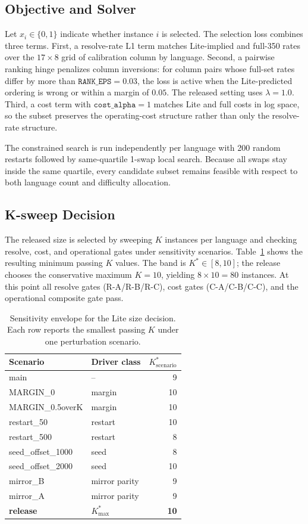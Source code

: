 \documentclass{llmxive}
\begin{document}
\subsection{Objective and Solver}

Let $x_i\in\{0,1\}$ indicate whether instance $i$ is selected.  The
selection loss combines three terms.  First, a resolve-rate L1 term
matches Lite-implied and full-350 rates over the $17\times 8$ grid of
calibration column by language.  Second, a pairwise ranking hinge
penalizes column inversions: for column pairs whose full-set rates
differ by more than $\texttt{RANK\_EPS}=0.03$, the loss is active when
the Lite-predicted ordering is wrong or within a margin of $0.05$.
The released setting uses $\lambda=1.0$.  Third, a cost term with
$\texttt{cost\_alpha}=1$ matches Lite and full costs in log space, so
the subset preserves the operating-cost structure rather than only the
resolve-rate structure.

The constrained search is run independently per language with 200
random restarts followed by same-quartile 1-swap local search.  Because
all swaps stay inside the same quartile, every candidate subset remains
feasible with respect to both language count and difficulty allocation.

\subsection{K-sweep Decision}

The released size is selected by sweeping $K$ instances per language and
checking resolve, cost, and operational gates under sensitivity
scenarios.  Table~\ref{tab:lite-k-sweep} shows the resulting minimum
passing $K$ values.  The band is $K^*\in[8,10]$; the release chooses the
conservative maximum $K=10$, yielding $8\times10=80$ instances.  At
this point all resolve gates (R-A/R-B/R-C), cost gates (C-A/C-B/C-C),
and the operational composite gate pass.

\begin{table}[!htbp]
\centering
\small
\begin{tabular}{llr}
\toprule
Scenario & Driver class & $K^*_{\mathrm{scenario}}$ \\
\midrule
main & -- & 9 \\
MARGIN\_0 & margin & 10 \\
MARGIN\_0.5overK & margin & 10 \\
restart\_50 & restart & 10 \\
restart\_500 & restart & 8 \\
seed\_offset\_1000 & seed & 8 \\
seed\_offset\_2000 & seed & 10 \\
mirror\_B & mirror parity & 9 \\
mirror\_A & mirror parity & 9 \\
\midrule
\textbf{release} & $K^*_{\max}$ & \textbf{10} \\
\bottomrule
\end{tabular}
\caption{Sensitivity envelope for the Lite size decision.  Each row
reports the smallest passing $K$ under one perturbation scenario.}
\label{tab:lite-k-sweep}
\end{table}
\end{document}

